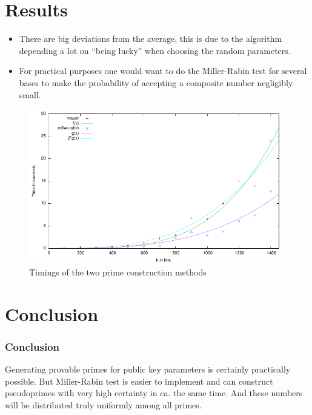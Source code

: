 \documentclass{beamer}
\begin{document}
\section{Results}
\begin{frame}
  \begin{itemize}
  \item There are big deviations from the average, this is due to the
    algorithm depending a lot on ``being lucky'' when choosing the
    random parameters.

  \item For practical purposes one would want to do the Miller-Rabin
    test for several bases to make the probability of accepting a
    composite number negligibly small.
  \end{itemize}
\end{frame}

\begin{frame}
\begin{figure}[h]
  \centering
  \includegraphics[scale=0.8]{plot.pdf}
  \caption{Timings of the two prime construction methods}
  \label{fig:timings}
\end{figure}
\end{frame}

\section{Conclusion}
\begin{frame}
  \frametitle{Conclusion}
Generating provable primes for public key parameters is certainly
practically possible. But Miller-Rabin test is easier to implement and
can construct pseudoprimes with very high certainty in ca. the same
time. And these numbers will be distributed truly uniformly among all
primes.
\end{frame}
\end{document}
